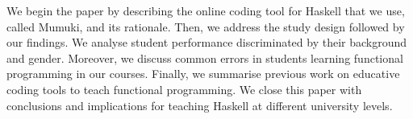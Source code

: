 We begin the paper by describing the online coding tool for Haskell that we use, called Mumuki, and its rationale. Then, we address the study design followed by our findings. We analyse student performance discriminated by their background and gender. Moreover, we discuss common errors in students learning functional programming in our courses. Finally, we summarise previous work on educative coding tools to teach functional programming. We close this paper with conclusions and implications for teaching Haskell at different university levels.








